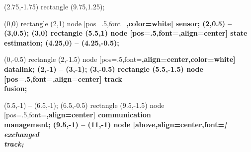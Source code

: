 

\BFS



 (2.75,-1.75) rectangle (9.75,1.25);


\drawsensorbox (0,0) rectangle (2,1) node [pos=.5,font=\bfseries,color=white] {sensor};
\drawsystemarrow (2,0.5) -- (3,0.5);
\drawsystembox (3,0) rectangle (5.5,1) node [pos=.5,font=\bfseries,align=center] {state \\ estimation};
\drawsystemarrow (4.25,0) -- (4.25,-0.5);


\drawsensorbox (0,-0.5) rectangle (2,-1.5) node [pos=.5,font=\bfseries,align=center,color=white] {datalink};
\drawsystemarrow (2,-1) -- (3,-1);
\drawsystembox (3,-0.5) rectangle (5.5,-1.5) node [pos=.5,font=\bfseries,align=center] {track \\ fusion};


\drawsystemarrow (5.5,-1) -- (6.5,-1);
\drawsystembox (6.5,-0.5) rectangle (9.5,-1.5) node [pos=.5,font=\bfseries,align=center] {communication \\ management};
\drawsystemarrow (9.5,-1) -- (11,-1) node [above,align=center,font=\it] {exchanged \\ track};

\EFS